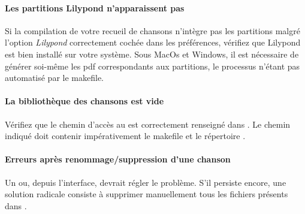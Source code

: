 \paragraph{Les partitions Lilypond n'apparaissent pas}
Si la compilation de votre recueil de chansons n'intègre pas les
partitions malgré l'option \emph{Lilypond} correctement cochée dans
les préférences, vérifiez que Lilypond est bien installé sur votre
système. Sous MacOs et Windows, il est nécessaire de générer soi-même
les pdf correspondants aux partitions, le processus n'étant pas
automatisé par le makefile.

\paragraph{La bibliothèque des chansons est vide} 
Vérifiez que le chemin d'accès au \recueil est correctement
renseigné dans . Le chemin indiqué doit contenir
impérativement le makefile et le répertoire .

\paragraph{Erreurs après renommage/suppression d'une chanson} 
Un  ou, depuis l'interface,  devrait
régler le problème. S'il persiste encore, une solution radicale
consiste à supprimer manuellement tous les fichiers  présents
dans .
